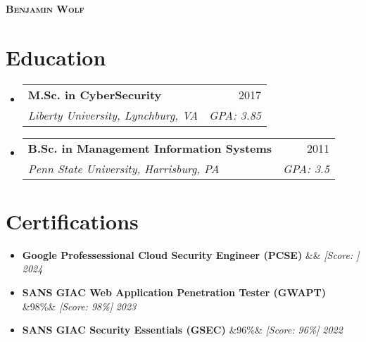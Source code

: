 \documentclass[letterpaper,11pt]{article}
\makeatletter
\newcommand{\resumeEducationHeading}[5]{
  \vspace{-2pt}\item
    \begin{tabular*}{0.97\textwidth}[t]{l@{\extracolsep{\fill}}r}
      \textbf{#1} & #2 \\
      \textit{\small #3, #4} & \textit{\small GPA: #5} \\
    \end{tabular*}\vspace{-5pt}
}
\newcommand{\resumeCertificationHeading}[3]{
  \vspace{-2pt}\item
    \textbf{#1} \ifx&#3& \else \textit{\small [Score: #3]} \fi \hfill \textit{\small #2} \vspace{-5pt}
}
\newcommand{\resumeSubHeadingListStart}{\begin{itemize}[leftmargin=0.15in, label={}]}
\newcommand{\resumeSubHeadingListEnd}{\end{itemize}}
\makeatother
\begin{document}

\begin{center}
  \textbf{\Huge \scshape Benjamin Wolf} \\ \vspace{3pt}
\end{center}


\section{Education}
\vspace{3pt}
\resumeSubHeadingListStart

\resumeEducationHeading
{M.Sc. in CyberSecurity}{2017}
{Liberty University}{Lynchburg, VA}
{3.85}

\resumeEducationHeading
{B.Sc. in Management Information Systems}{2011}
{Penn State University}{Harrisburg, PA}
{3.5}

\resumeSubHeadingListEnd


\section{Certifications}
\vspace{3pt}
\resumeSubHeadingListStart

\resumeCertificationHeading
{Google Professessional Cloud Security Engineer (PCSE)}{2024}{}

\resumeCertificationHeading
{SANS GIAC Web Application Penetration Tester (GWAPT)}{2023}{98\%}

\resumeCertificationHeading
{SANS GIAC Security Essentials (GSEC)}{2022}{96\%}

\resumeSubHeadingListEnd
\end{document}

